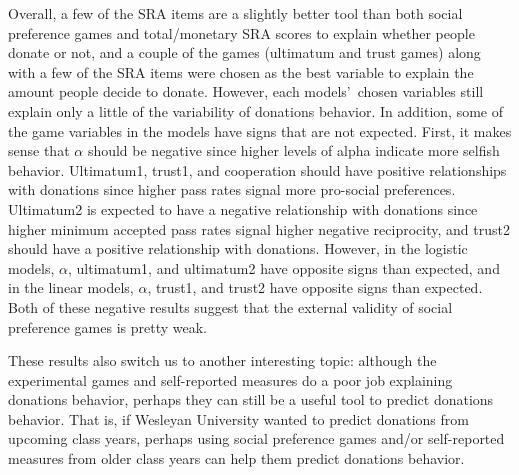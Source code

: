 \documentclass[12pt]{article}
\begin{document}
Overall, a few of the SRA items are a slightly better tool than both social preference games and total/monetary SRA scores to explain whether people donate or not, and a couple of the games (ultimatum and trust games) along with a few of the SRA items were chosen as the best variable to explain the amount people decide to donate. However, each models\rq \ chosen variables still explain only a little of the variability of donations behavior. In addition, some of the game variables in the models have signs that are not expected. First, it makes sense that \(\alpha\) should be negative since higher levels of alpha indicate more selfish behavior. Ultimatum1, trust1, and cooperation should have positive relationships with donations since higher pass rates signal more pro-social preferences. Ultimatum2 is expected to have a negative relationship with donations since higher minimum accepted pass rates signal higher negative reciprocity, and trust2 should have a positive relationship with donations. However, in the logistic models, \(\alpha\), ultimatum1, and ultimatum2 have opposite signs than expected, and in the linear models, \(\alpha\), trust1, and trust2 have opposite signs than expected. Both of these negative results suggest that the external validity of social preference games is pretty weak.

These results also switch us to another interesting topic: although the experimental games and self-reported measures do a poor job explaining donations behavior, perhaps they can still be a useful tool to predict donations behavior. That is, if Wesleyan University wanted to predict donations from upcoming class years, perhaps using social preference games and/or self-reported measures from older class years can help them predict donations behavior.
\end{document}
